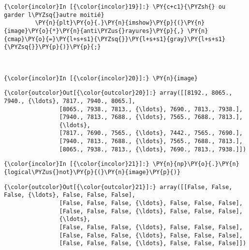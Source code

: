     \begin{Verbatim}[commandchars=\\\{\}]
{\color{incolor}In [{\color{incolor}19}]:} \PY{c+c1}{\PYZsh{} ou garder l\PYZsq{}autre moitié}
         \PY{n}{plt}\PY{o}{.}\PY{n}{imshow}\PY{p}{(}\PY{n}{image}\PY{o}{*}\PY{n}{anti\PYZus{}rayures}\PY{p}{,} \PY{n}{cmap}\PY{o}{=}\PY{l+s+s1}{\PYZsq{}}\PY{l+s+s1}{gray}\PY{l+s+s1}{\PYZsq{}}\PY{p}{)}\PY{p}{;}
\end{Verbatim}


    \begin{center}
    \end{center}
    { \hspace*{\fill} \\}
    
    \begin{Verbatim}[commandchars=\\\{\}]
{\color{incolor}In [{\color{incolor}20}]:} \PY{n}{image}
\end{Verbatim}


\begin{Verbatim}[commandchars=\\\{\}]
{\color{outcolor}Out[{\color{outcolor}20}]:} array([[8192., 8065., 7940., {\ldots}, 7817., 7940., 8065.],
                [8065., 7938., 7813., {\ldots}, 7690., 7813., 7938.],
                [7940., 7813., 7688., {\ldots}, 7565., 7688., 7813.],
                {\ldots},
                [7817., 7690., 7565., {\ldots}, 7442., 7565., 7690.],
                [7940., 7813., 7688., {\ldots}, 7565., 7688., 7813.],
                [8065., 7938., 7813., {\ldots}, 7690., 7813., 7938.]])
\end{Verbatim}
            
    \begin{Verbatim}[commandchars=\\\{\}]
{\color{incolor}In [{\color{incolor}21}]:} \PY{n}{np}\PY{o}{.}\PY{n}{logical\PYZus{}not}\PY{p}{(}\PY{n}{image}\PY{p}{)}
\end{Verbatim}


\begin{Verbatim}[commandchars=\\\{\}]
{\color{outcolor}Out[{\color{outcolor}21}]:} array([[False, False, False, {\ldots}, False, False, False],
                [False, False, False, {\ldots}, False, False, False],
                [False, False, False, {\ldots}, False, False, False],
                {\ldots},
                [False, False, False, {\ldots}, False, False, False],
                [False, False, False, {\ldots}, False, False, False],
                [False, False, False, {\ldots}, False, False, False]])
\end{Verbatim}
            
